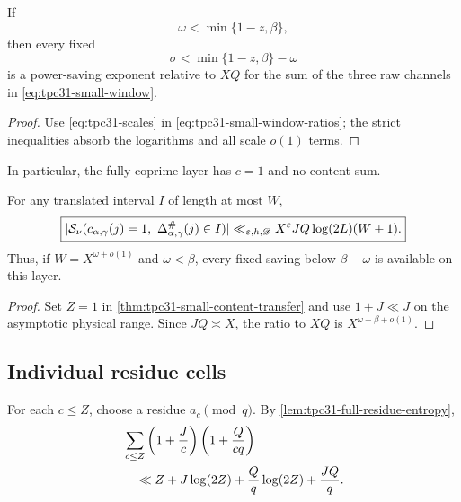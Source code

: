 \begin{corollary}
\label{cor:tpc31-small-window-saving}
If
\begin{equation}
 \omega<\min\{1-z,\beta\},
 \label{eq:tpc31-small-window-positive}
\end{equation}
then every fixed
\begin{equation}
 \sigma<\min\{1-z,\beta\}-\omega
 \label{eq:tpc31-small-window-saving-exponent}
\end{equation}
is a power-saving exponent relative to $XQ$ for the sum of the three
raw channels in \eqref{eq:tpc31-small-window}.
\end{corollary}

\begin{proof}
Use \eqref{eq:tpc31-scales} in
\eqref{eq:tpc31-small-window-ratios}; the strict inequalities absorb
the logarithms and all scale $o(1)$ terms.
\end{proof}

In particular, the fully coprime layer has $c=1$ and no content sum.

\begin{corollary}
\label{cor:tpc31-coprime-window}
For any translated interval $I$ of length at most $W$,
\begin{equation}
 \boxed{
 |\mathcal S_\nu(c_{\alpha,\gamma}(j)=1,
            \ \Delta^\#_{\alpha,\gamma}(j)\in I)|
 \ll_{\varepsilon,h,\mathscr D}
 X^\varepsilon JQ\log(2L)(W+1).}
 \label{eq:tpc31-coprime-window}
\end{equation}
Thus, if $W=X^{\omega+o(1)}$ and $\omega<\beta$, every fixed saving
below $\beta-\omega$ is available on this layer.
\end{corollary}

\begin{proof}
Set $Z=1$ in \cref{thm:tpc31-small-content-transfer} and use
$1+J\ll J$ on the asymptotic physical range.  Since $JQ\asymp X$,
the ratio to $XQ$ is $X^{\omega-\beta+o(1)}$.
\end{proof}

\subsection{Individual residue cells}

For each $c\le Z$, choose a residue $a_c\pmod q$.  By
\cref{lem:tpc31-full-residue-entropy},
\begin{align}
 &\sum_{c\le Z}\left(1+\frac Jc\right)
 \left(1+\frac Q{cq}\right)
 \notag\\
 &\quad\ll
 Z+J\log(2Z)+\frac Qq\log(2Z)+\frac{JQ}q.
 \label{eq:tpc31-residue-harmonic-sum}
\end{align}

